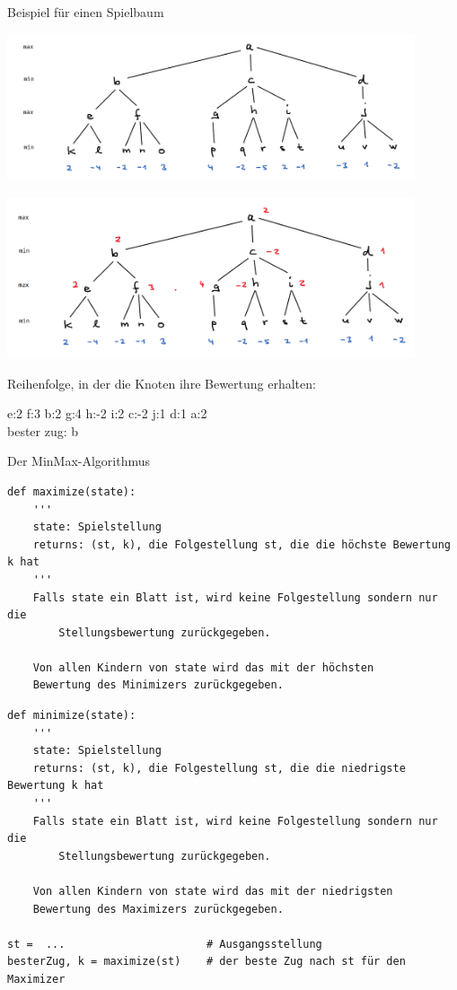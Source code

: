 \begin{frame}[fragile]
Beispiel für einen Spielbaum

\includegraphics[width=12cm]{bild10.png} 

\end{frame}

\begin{frame}[fragile]


\includegraphics[width=12cm]{bild11.png} 

Reihenfolge, in der die Knoten ihre 
Bewertung erhalten:

e:2 f:3 b:2 g:4 h:-2 i:2 c:-2 j:1 d:1 a:2 \\
bester zug: b

\end{frame}

\begin{frame}[fragile]
Der MinMax-Algorithmus
\begin{lstlisting}[basicstyle=\tiny]
def maximize(state):
    '''
    state: Spielstellung
    returns: (st, k), die Folgestellung st, die die höchste Bewertung k hat
    '''
    Falls state ein Blatt ist, wird keine Folgestellung sondern nur die 
        Stellungsbewertung zurückgegeben.
    
    Von allen Kindern von state wird das mit der höchsten
    Bewertung des Minimizers zurückgegeben.
\end{lstlisting} 
\begin{lstlisting}[basicstyle=\tiny]
def minimize(state):
    '''
    state: Spielstellung
    returns: (st, k), die Folgestellung st, die die niedrigste Bewertung k hat
    '''
    Falls state ein Blatt ist, wird keine Folgestellung sondern nur die 
        Stellungsbewertung zurückgegeben.
    
    Von allen Kindern von state wird das mit der niedrigsten
    Bewertung des Maximizers zurückgegeben.
    
st =  ...                      # Ausgangsstellung
besterZug, k = maximize(st)    # der beste Zug nach st für den Maximizer
\end{lstlisting} 
\end{frame}

